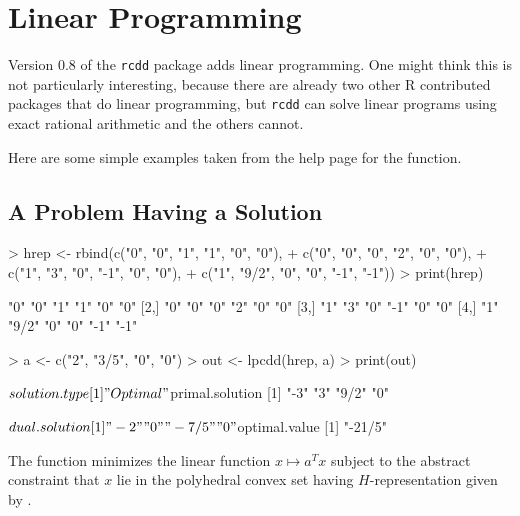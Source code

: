 \documentclass{article}
\begin{document}
\section{Linear Programming}

Version 0.8 of the \texttt{rcdd} package adds linear programming.
One might think this is not particularly interesting, because there
are already two other R contributed packages that do linear programming,
but \texttt{rcdd} can solve linear programs using exact rational arithmetic
and the others cannot.

Here are some simple examples taken from the help page for the 
function.

\subsection{A Problem Having a Solution}

\begin{Schunk}
\begin{Sinput}
> hrep <- rbind(c("0", "0", "1", "1", "0", "0"),
+               c("0", "0", "0", "2", "0", "0"),
+               c("1", "3", "0", "-1", "0", "0"),
+               c("1", "9/2", "0", "0", "-1", "-1"))
> print(hrep)
\end{Sinput}
\begin{Soutput}
     [,1] [,2]  [,3] [,4] [,5] [,6]
[1,] "0"  "0"   "1"  "1"  "0"  "0" 
[2,] "0"  "0"   "0"  "2"  "0"  "0" 
[3,] "1"  "3"   "0"  "-1" "0"  "0" 
[4,] "1"  "9/2" "0"  "0"  "-1" "-1"
\end{Soutput}
\begin{Sinput}
> a <- c("2", "3/5", "0", "0")
> out <- lpcdd(hrep, a)
> print(out)
\end{Sinput}
\begin{Soutput}
$solution.type
[1] "Optimal"

$primal.solution
[1] "-3"  "3"   "9/2" "0"  

$dual.solution
[1] "-2"   "0"    "-7/5" "0"   

$optimal.value
[1] "-21/5"
\end{Soutput}
\end{Schunk}

The function \verb@lpcdd@ minimizes the linear function $x \mapsto a^T x$
subject to the abstract constraint that $x$ lie in the polyhedral convex
set having $H$-representation given by \verb@hrep@.
\end{document}
